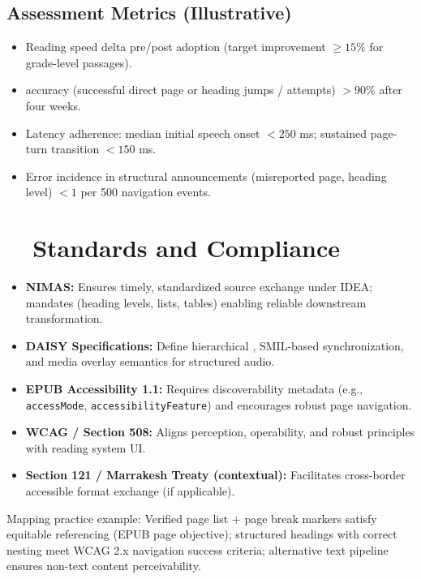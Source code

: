 \subsection{Assessment Metrics (Illustrative)}
\begin{itemize}
	\item Reading speed delta pre/post adoption (target improvement $\ge 15\%$ for grade-level passages).
	\item {} accuracy (successful direct page or heading jumps / attempts) $> 90\%$ after four weeks.
	\item Latency adherence: median initial speech onset $< 250$ ms; sustained page-turn transition $< 150$ ms.
	\item Error incidence in structural announcements (misreported page, heading level) $< 1$ per 500 navigation events.
\end{itemize}

\section{~~Standards and Compliance}\label{ch07:sec:standards-compliance}
\begin{itemize}
	\item \textbf{NIMAS:} Ensures timely, standardized source exchange under IDEA; mandates 
	      (heading levels, lists, tables) enabling reliable downstream transformation.
	\item \textbf{DAISY Specifications:} Define hierarchical , SMIL-based synchronization,
	      and media overlay semantics for structured audio.
	\item \textbf{EPUB Accessibility 1.1:} Requires discoverability metadata (e.g., \texttt{accessMode},
	      \texttt{accessibilityFeature}) and encourages robust page navigation\supercite{W3CMediaA11y}.
	\item \textbf{WCAG / Section 508:} Aligns perception, operability, and robust principles with reading system UI.
	\item \textbf{Section 121 / Marrakesh Treaty (contextual):} Facilitates cross-border accessible format exchange (if applicable).
\end{itemize}

Mapping practice example: Verified page list + page break markers satisfy equitable referencing (EPUB page  objective);
structured headings with correct nesting meet WCAG 2.x navigation success criteria; alternative text pipeline ensures
non-text content perceivability.

